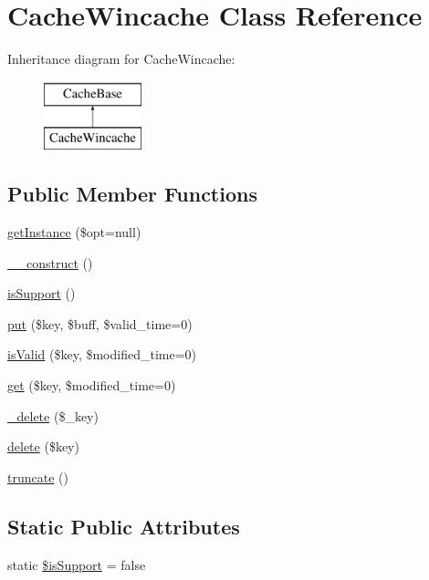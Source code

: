 \hypertarget{classCacheWincache}{\section{Cache\-Wincache Class Reference}
\label{classCacheWincache}
}
Inheritance diagram for Cache\-Wincache\-:\begin{figure}[H]
\begin{center}
\leavevmode
\includegraphics[height=2.000000cm]{classCacheWincache}
\end{center}
\end{figure}
\subsection*{Public Member Functions}
\begin{DoxyCompactItemize}
\item 
\hyperlink{classCacheWincache_a4de3bb419825ceebbfbe5374cd144e07}{get\-Instance} (\$opt=null)
\item 
\hyperlink{classCacheWincache_aa88492e9f3fc7318121052f78931be32}{\-\_\-\-\_\-construct} ()
\item 
\hyperlink{classCacheWincache_a816994c866a29c5c7b117996de2f513c}{is\-Support} ()
\item 
\hyperlink{classCacheWincache_a1302d9ee0f33efefc8c690a9a9a5f9e1}{put} (\$key, \$buff, \$valid\-\_\-time=0)
\item 
\hyperlink{classCacheWincache_af8d27de13a90149d523c59dc589d2c15}{is\-Valid} (\$key, \$modified\-\_\-time=0)
\item 
\hyperlink{classCacheWincache_a36123121cdf50235b64929c3a13b596b}{get} (\$key, \$modified\-\_\-time=0)
\item 
\hyperlink{classCacheWincache_ab20145a0ee5672f182b6da797c80b77a}{\-\_\-delete} (\$\-\_\-key)
\item 
\hyperlink{classCacheWincache_ae7bfddf70b319e76b50f06d50ec720a2}{delete} (\$key)
\item 
\hyperlink{classCacheWincache_a2da6969290f8ded04554bfaddce5825d}{truncate} ()
\end{DoxyCompactItemize}
\subsection*{Static Public Attributes}
\begin{DoxyCompactItemize}
\item 
static \hyperlink{classCacheWincache_a633cb53cf9535236075169604bf363e3}{\$is\-Support} = false
\end{DoxyCompactItemize}
